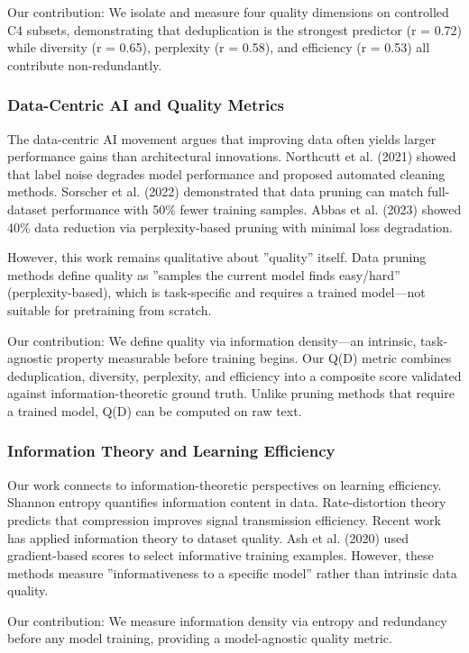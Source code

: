 Our contribution: We isolate and measure four quality dimensions on controlled C4 subsets, demonstrating that deduplication is the strongest predictor (r = 0.72) while diversity (r = 0.65), perplexity (r = 0.58), and efficiency (r = 0.53) all contribute non-redundantly.

\subsubsection{Data-Centric AI and Quality Metrics}

The data-centric AI movement argues that improving data often yields larger performance gains than architectural innovations. Northcutt et al. (2021) showed that label noise degrades model performance and proposed automated cleaning methods. Sorscher et al. (2022) demonstrated that data pruning can match full-dataset performance with 50\% fewer training samples. Abbas et al. (2023) showed 40\% data reduction via perplexity-based pruning with minimal loss degradation.

However, this work remains qualitative about ''quality'' itself. Data pruning methods define quality as ''samples the current model finds easy/hard'' (perplexity-based), which is task-specific and requires a trained model---not suitable for pretraining from scratch.

Our contribution: We define quality via information density---an intrinsic, task-agnostic property measurable before training begins. Our Q(D) metric combines deduplication, diversity, perplexity, and efficiency into a composite score validated against information-theoretic ground truth. Unlike pruning methods that require a trained model, Q(D) can be computed on raw text.

\subsubsection{Information Theory and Learning Efficiency}

Our work connects to information-theoretic perspectives on learning efficiency. Shannon entropy quantifies information content in data. Rate-distortion theory predicts that compression improves signal transmission efficiency. Recent work has applied information theory to dataset quality. Ash et al. (2020) used gradient-based scores to select informative training examples. However, these methods measure ''informativeness to a specific model'' rather than intrinsic data quality.

Our contribution: We measure information density via entropy and redundancy before any model training, providing a model-agnostic quality metric.

